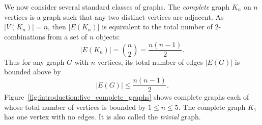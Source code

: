 We now consider several standard classes of graphs. The \emph{complete}
graph $K_n$ on $n$ vertices is a graph such that any two distinct
vertices are adjacent. As $|V(K_n)| = n$, then $|E(K_n)|$ is
equivalent to the total number of 2-combinations from a set of $n$
objects:
%
\begin{equation}
\label{eq:introduction:size_of_K_n}
|E(K_n)|
=
\binom{n}{2}
=
\frac{n(n-1)}{2}.
\end{equation}
%
Thus for any graph $G$ with $n$ vertices, its total number of edges
$|E(G)|$ is bounded above by
\[
|E(G)|
\leq
\frac{n(n - 1)}{2}.
\]
Figure~\ref{fig:introduction:five_complete_graphs} shows complete
graphs each of whose total number of vertices is bounded by
$1 \leq n \leq 5$. The complete graph $K_1$ has one vertex with
no edges. It is also called the \emph{trivial} graph.

